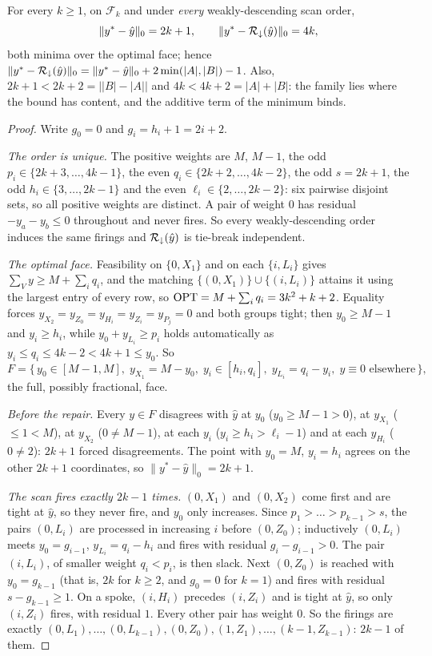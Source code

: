 \begin{proposition}\label{prop:sharpattained}
For every $k \ge 1$, on $\mathcal{F}_k$ and under \emph{every} weakly-descending scan order,
\[
  \|y^* - \hat y\|_0 = 2k+1, \qquad \|y^* - \mathcal{R}_{\downarrow}(\hat y)\|_0 = 4k ,
\]
both minima over the optimal face; hence
$\|y^* - \mathcal{R}_{\downarrow}(\hat y)\|_0 = \|y^* - \hat y\|_0 + 2\min(|A|,|B|) - 1$. Also,
$2k+1 < 2k+2 = \bigl||B|-|A|\bigr|$ and $4k < 4k+2 = |A|+|B|$: the family lies where the bound
has content, and the additive term of the minimum binds.
\end{proposition}

\begin{proof}
Write $g_0 = 0$ and $g_i = h_i + 1 = 2i+2$.

\emph{The order is unique.} The positive weights are $M$, $M-1$, the odd $p_i \in \{2k+3,\dots,4k-1\}$,
the even $q_i \in \{2k+2,\dots,4k-2\}$, the odd $s = 2k+1$, the odd $h_i \in \{3,\dots,2k-1\}$ and the
even $\ell_i \in \{2,\dots,2k-2\}$: six pairwise disjoint sets, so all positive weights are
distinct. A pair of weight $0$ has residual $-y_a - y_b \le 0$ throughout and never fires. So every
weakly-descending order induces the same firings and $\mathcal{R}_\downarrow(\hat y)$ is tie-break
independent.

\emph{The optimal face.} Feasibility on $\{0,X_1\}$ and on each $\{i, L_i\}$ gives
$\sum_V y \ge M + \sum_i q_i$, and the matching $\{(0,X_1)\} \cup \{(i,L_i)\}$ attains it using the
largest entry of every row, so $\mathrm{OPT} = M + \sum_i q_i = 3k^2+k+2$. Equality forces
$y_{X_2} = y_{Z_0} = y_{H_i} = y_{Z_i} = y_{P_j} = 0$ and both groups tight; then $y_0 \ge M-1$ and
$y_i \ge h_i$, while $y_0 + y_{L_i} \ge p_i$ holds automatically as
$y_i \le q_i \le 4k-2 < 4k+1 \le y_0$. So
\[
  F = \bigl\{\, y_0 \in [M-1, M],\; y_{X_1} = M - y_0,\;
      y_i \in [h_i, q_i],\; y_{L_i} = q_i - y_i,\; y \equiv 0 \text{ elsewhere} \,\bigr\},
\]
the full, possibly fractional, face.

\emph{Before the repair.} Every $y \in F$ disagrees with $\hat y$ at $y_0$ ($y_0 \ge M-1 > 0$), at
$y_{X_1}$ ($\le 1 < M$), at $y_{X_2}$ ($0 \ne M-1$), at each $y_i$ ($y_i \ge h_i > \ell_i - 1$) and
at each $y_{H_i}$ ($0 \ne 2$): $2k+1$ forced disagreements. The point with $y_0 = M$, $y_i = h_i$
agrees on the other $2k+1$ coordinates, so $\|y^* - \hat y\|_0 = 2k+1$.

\emph{The scan fires exactly $2k-1$ times.} $(0,X_1)$ and $(0,X_2)$ come first and are tight
at $\hat y$, so they never fire, and $y_0$ only increases. Since
$p_1 > \dots > p_{k-1} > s$, the pairs $(0,L_i)$ are processed in increasing $i$ before $(0,Z_0)$;
inductively $(0,L_i)$ meets $y_0 = g_{i-1}$, $y_{L_i} = q_i - h_i$ and fires with residual
$g_i - g_{i-1} > 0$. The pair $(i,L_i)$, of smaller weight $q_i < p_i$, is then slack. Next
$(0,Z_0)$ is reached with $y_0 = g_{k-1}$ (that is, $2k$ for $k \ge 2$, and $g_0 = 0$ for
$k = 1$) and fires with residual $s - g_{k-1} \ge 1$. On a spoke, $(i,H_i)$ precedes $(i,Z_i)$ and
is tight at $\hat y$, so only $(i,Z_i)$ fires, with residual $1$.
Every other pair has weight $0$. So the firings are exactly
$(0,L_1),\dots,(0,L_{k-1}),(0,Z_0),(1,Z_1),\dots,(k-1,Z_{k-1})$: $2k-1$ of them.


\end{proof}

